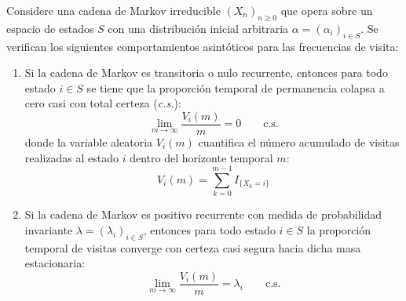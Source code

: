 \documentclass[10pt]{book}
\begin{document}
\begin{teo}
    Considere una cadena de Markov irreducible $(X_n)_{n \geq 0}$ que opera sobre un espacio de estados $S$ con una distribución inicial arbitraria \mbox{$\alpha = (\alpha_i)_{i \in S}$}. Se verifican los siguientes comportamientos asintóticos para las frecuencias de visita:
    \begin{enumerate}
        \item Si la cadena de Markov es transitoria o nulo recurrente, entonces para todo estado $i \in S$ se tiene que la proporción temporal de permanencia colapsa a cero casi con total certeza (\textit{c.s.}):
        \[
        \lim_{m \to \infty} \frac{V_i(m)}{m} = 0 \qquad \text{c.s.}
        \]
        donde la variable aleatoria $V_i(m)$ cuantifica el número acumulado de visitas realizadas al estado $i$ dentro del horizonte temporal $m$:
        \[ 
        V_i(m) = \sum_{k=0 }^{m-1} I_{\{X_k = i\}} 
        \]
        
        \item Si la cadena de Markov es positivo recurrente con medida de probabilidad invariante \mbox{$\lambda = (\lambda_i)_{i \in S}$}, entonces para todo estado $i \in S$ la proporción temporal de visitas converge con certeza casi segura hacia dicha masa estacionaria:
        \[
        \lim_{m \to \infty} \frac{V_i(m)}{m} = \lambda_i \qquad \text{c.s.}
        \]
    \end{enumerate}
\end{teo}
\end{document}

